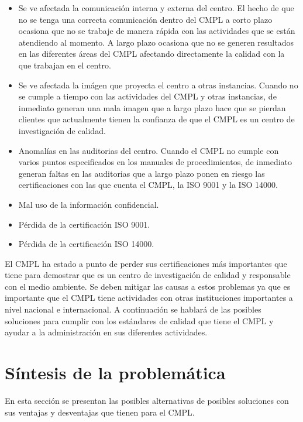 \begin{itemize}
	\item Se ve afectada la comunicación interna y externa del centro.	
El hecho de que no se tenga una correcta comunicación dentro del CMPL a corto plazo ocasiona que no se trabaje de manera rápida con las actividades que se están atendiendo al momento. A largo plazo ocasiona que no se generen resultados en las diferentes áreas del CMPL afectando directamente la calidad con la que trabajan en el centro. 

	\item Se ve afectada la imágen que proyecta el centro a otras instancias.
Cuando no se cumple a tiempo con las actividades del CMPL y otras instancias, de inmediato generan una mala imagen que a largo plazo hace que se pierdan clientes que actualmente tienen la confianza de que el CMPL es un centro de investigación de calidad.

	\item Anomalías en las auditorias del centro.
Cuando el CMPL no cumple con varios puntos especificados en los manuales de procedimientos, de inmediato generan faltas en las auditorias que a largo plazo ponen en riesgo las certificaciones con las que cuenta el CMPL, la ISO 9001 y la ISO 14000. 

	\item Mal uso de la información confidencial.
	\item Pérdida de la certificación ISO 9001.
	\item Pérdida de la certificación ISO 14000.
\end{itemize}

El CMPL ha estado a punto de perder sus certificaciones más importantes que tiene para demostrar que es un centro de investigación de calidad y responsable con el medio ambiente. Se deben mitigar las causas a estos problemas ya que es importante que el CMPL tiene actividades con otras instituciones importantes a nivel nacional e internacional. A continuación se hablará de las posibles soluciones para cumplir con los estándares de calidad que tiene el CMPL y ayudar a la administración en sus diferentes actividades. 

\section{Síntesis de la problemática}

En esta sección se presentan las posibles alternativas de posibles soluciones con sus ventajas y desventajas que tienen para el CMPL.




